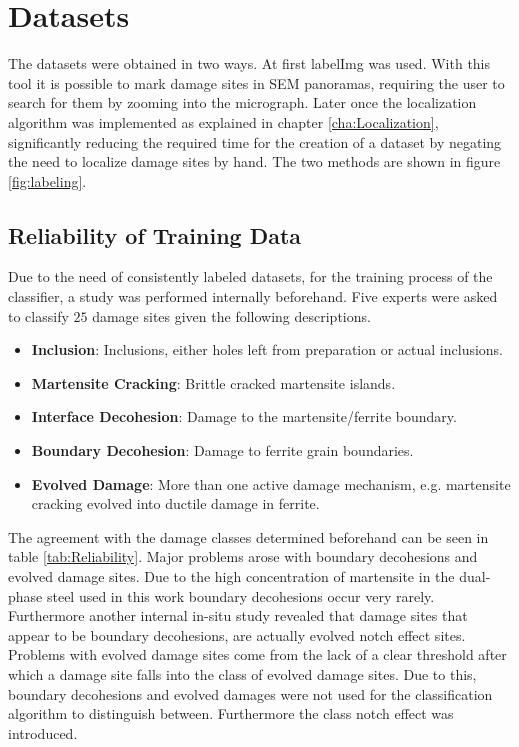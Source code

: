 \chapter{Datasets}

The datasets were obtained in two ways. At first labelImg \cite{labelImg} was used. With this tool it is possible to mark damage sites in SEM panoramas, requiring the user to search for them by zooming into the micrograph. Later once the localization algorithm was implemented as explained in chapter \ref{cha:Localization}, significantly reducing the required time for the creation of a dataset by negating the need to localize damage sites by hand. The two methods are shown in figure \ref{fig:labeling}. \\

\section{Reliability of Training Data}

Due to the need of consistently labeled datasets, for the training process of the classifier, a study was performed internally beforehand. Five experts were asked to classify $25$ damage sites given the following descriptions. 
\begin{itemize}[label={}]
\item \textbf{Inclusion}: Inclusions, either holes left from preparation or actual inclusions.
\item \textbf{Martensite Cracking}: Brittle cracked martensite islands.
\item \textbf{Interface Decohesion}: Damage to the martensite/ferrite boundary.
\item \textbf{Boundary Decohesion}: Damage to ferrite grain boundaries.
\item \textbf{Evolved Damage}: More than one active damage mechanism, e.g. martensite cracking evolved into ductile damage in ferrite.
\end{itemize}
The agreement with the damage classes determined beforehand can be seen in table \ref{tab:Reliability}. Major problems arose with boundary decohesions and evolved damage sites. Due to the high concentration of martensite in the dual-phase steel used in this work boundary decohesions occur very rarely. Furthermore another internal in-situ study revealed that damage sites that appear to be boundary decohesions, are actually evolved notch effect sites. Problems with evolved damage sites come from the lack of a clear threshold after which a damage site falls into the class of evolved damage sites. Due to this, boundary decohesions and evolved damages were not used for the classification algorithm to distinguish between. Furthermore the class notch effect was introduced. \\

